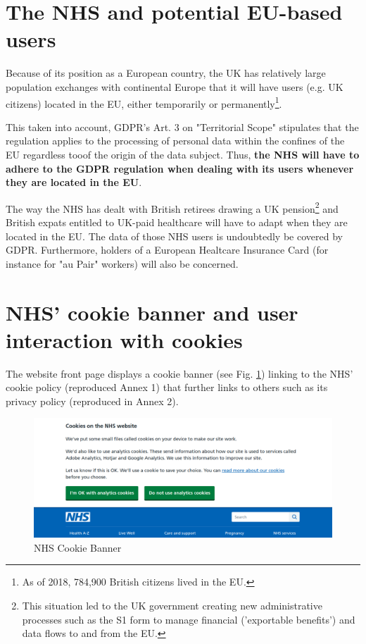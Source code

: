 \documentclass[twocolumn, letterpaper,13pt]{scrartcl}
\begin{document}
	\section{The NHS and potential EU-based users}
	
	    Because of its position as a European country, the UK has relatively large population exchanges with continental Europe that it will have users (e.g. UK citizens) located in the EU, either temporarily or permanently\footnote{As of 2018, 784,900 British citizens lived in the EU\cite{euBritStats}.}.
	    
	    This taken into account, GDPR's Art. 3 on "Territorial Scope" stipulates that the regulation applies to the processing of personal data within the confines of the EU regardless tooof the origin of the data subject\cite{art3}. Thus, \textbf{the NHS will have to adhere to the GDPR regulation when dealing with its users whenever they are located in the EU}.
	    
	    The way the NHS has dealt with British retirees drawing a UK pension\footnote{This situation led to the UK government creating new administrative processes such as the S1 form to manage financial ('exportable benefits') and data flows to and from the EU.} and British expats entitled to UK-paid healthcare\cite{pensionsAndHealthcare} will have to adapt when they are located in the EU. The data of those NHS users is undoubtedly be covered by GDPR. Furthermore, holders of a European Healtcare Insurance Card\cite{ehic} (for instance for "au Pair" workers) will also be concerned.
	
	\section{NHS' cookie banner and user interaction with cookies}
	
	    The website front page displays a cookie banner (see Fig. \ref{fig:a}) linking to the NHS' cookie policy\cite{cookiepolicy} (reproduced Annex 1) that further links to others such as its privacy policy\cite{privacypolicy} (reproduced in Annex 2). 
	    
	    \begin{figure}	\includegraphics[width=0.98\linewidth]{nhs_cookie_bar.png}
     		\caption{NHS Cookie Banner\label{fig:a}}
      	\end{figure}
	
\end{document}
